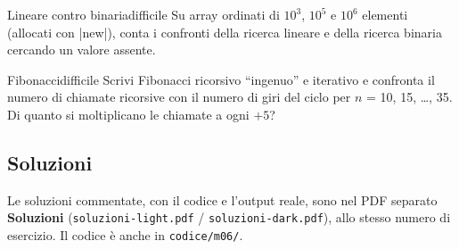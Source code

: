\begin{esercizio}{Lineare contro binaria}{difficile}
Su array ordinati di $10^3$, $10^5$ e $10^6$ elementi (allocati con \cc|new|), conta
i confronti della ricerca lineare e della ricerca binaria cercando un valore assente.
\end{esercizio}

\begin{esercizio}{Fibonacci}{difficile}
Scrivi Fibonacci ricorsivo ``ingenuo'' e iterativo e confronta il numero di chiamate
ricorsive con il numero di giri del ciclo per $n$ = 10, 15, \ldots, 35. Di quanto si
moltiplicano le chiamate a ogni $+5$?
\end{esercizio}

\subsection*{Soluzioni}
Le soluzioni commentate, con il codice e l'output reale, sono nel PDF separato
\textbf{Soluzioni} (\texttt{soluzioni-light.pdf} / \texttt{soluzioni-dark.pdf}),
allo stesso numero di esercizio. Il codice è anche in \texttt{codice/m06/}.
